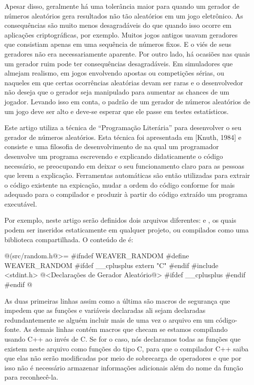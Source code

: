 Apesar disso, geralmente há uma tolerância maior para quando um
gerador de números aleatórios gera resultados não tão aleatórios em um
jogo eletrônico. As consequências são muito menos desagradáveis do que
quando isso ocorre em aplicações criptográficas, por exemplo. Muitos
jogos antigos usavam geradores que consistiam apenas em uma sequência
de números fixos. E o viés de seus geradores não era necessariamente
aparente. Por outro lado, há ocasiões nas quais um gerador ruim pode
ter consequências desagradáveis. Em simuladores que almejam realismo,
em jogos envolvendo apostas ou competições sérias, ou naqueles em que
certas ocorrências aleatórias devam ser raras e o desenvolvedor não
deseja que o gerador seja manipulado para aumentar as chances de um
jogador. Levando isso em conta, o padrão de um gerador de números
aleatórios de um jogo deve ser alto e deve-se esperar que ele passe em
testes estatísticos.


Este artigo utiliza a técnica de ``Programação Literária'' para
desenvolver o seu gerador de números aleatórios. Esta técnica foi apresentada
em [Knuth, 1984] e consiste e uma filosofia de desenvolvimento de
 na qual um programador desenvolve um programa escrevendo
e explicando didaticamente o código necessário, se preocupando em
deixar o seu funcionamento claro para as pessoas que lerem a
explicação. Ferramentas automáticas são então utilizadas para extrair
o código existente na expicação, mudar a ordem do código conforme for
mais adequado para o compilador e produzir à partir do código extraído
um programa executável.

Por exemplo, neste artigo serão definidos dois arquivos
diferentes:  e , os quais
podem ser inseridos estaticamente em qualquer projeto, ou compilados
como uma biblioteca compartilhada. O conteúdo de 
é:

\iniciocodigo
@(src/random.h@>=
#ifndef WEAVER_RANDOM
#define WEAVER_RANDOM
#ifdef __cplusplus
extern "C" {
#endif
#include <stdint.h>
@<Declarações de Gerador Aleatório@>
#ifdef __cplusplus
}
#endif
#endif
@
\fimcodigo

As duas primeiras linhas assim como a última são macros de segurança
que impedem que as funções e variáveis declaradas ali sejam declaradas
redundantemente se alguém incluir mais de uma vez o arquivo em um
código-fonte. As demais linhas contém macros que checam se estamos
compilando usando C++ ao invés de C. Se for o caso, nós declaramos
todas as funções que existem neste arquivo como funções do tipo C,
para que o compilador C++ saiba que elas não serão modificadas por
meio de sobrecarga de operadores e que por isso não é necessário
armazenar informações adicionais além do nome da função para
reconhecê-la.

